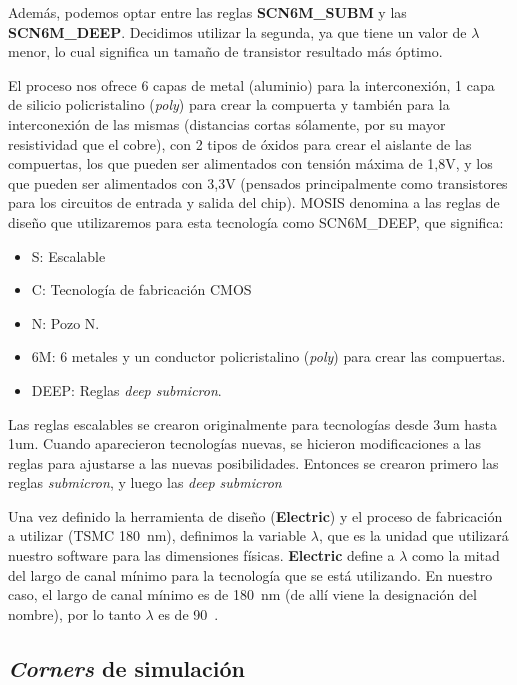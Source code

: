 Además, podemos optar entre las reglas \textbf{SCN6M\_SUBM} y las \textbf{SCN6M\_DEEP}. Decidimos utilizar la segunda, ya que tiene un valor de $\lambda$ menor, lo cual significa un tamaño de transistor resultado más óptimo.

El proceso nos ofrece 6 capas de metal (aluminio) para la interconexión, 1 capa de silicio policristalino (\emph{poly}) para crear la compuerta y también para la interconexión de las mismas (distancias cortas sólamente, por su mayor resistividad que el cobre), con 2 tipos de óxidos para crear el aislante de las compuertas, los que pueden ser alimentados con tensión máxima de 1,8V, y los que pueden ser alimentados con 3,3V (pensados principalmente como transistores para los circuitos de entrada y salida del chip). MOSIS denomina a las reglas de diseño que utilizaremos para esta tecnología como SCN6M\_DEEP, que significa: 
\begin{itemize}
\item S: Escalable
\item C: Tecnología de fabricación CMOS
\item N: Pozo N.
\item 6M: 6 metales y un conductor policristalino (\emph{poly}) para crear las compuertas.
\item DEEP: Reglas \emph{deep submicron}.
\end{itemize}
Las reglas escalables se crearon originalmente para tecnologías desde 3um hasta 1um. Cuando aparecieron tecnologías nuevas, se hicieron modificaciones a las reglas para ajustarse a las nuevas posibilidades. Entonces se crearon primero las reglas \emph{submicron}, y luego las \emph{deep submicron}

Una vez definido la herramienta de diseño (\textbf{Electric}) y el proceso de fabricación a utilizar (TSMC 180~nm), definimos la variable $\lambda$, que es la unidad que utilizará nuestro software para las dimensiones físicas. \textbf{Electric} define a $\lambda$ como la mitad del largo de canal mínimo para la tecnología que se está utilizando. En nuestro caso, el largo de canal mínimo es de 180~nm (de allí viene la designación del nombre), por lo tanto $\lambda $ es de 90~\nanom.  


\subsection{\emph{Corners} de simulación}

